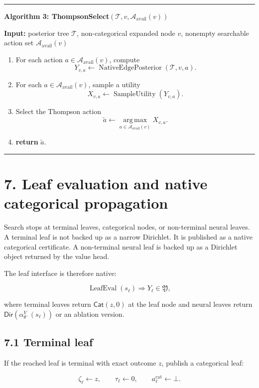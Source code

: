 \documentclass[11pt]{article}
\newcommand{\argmax}{\operatorname*{arg\,max}}
\newcommand{\Tree}{\mathcal{T}}
\newcommand{\Available}{\mathcal{A}_{\mathrm{avail}}}
\newcommand{\Native}{\mathfrak{Y}}
\newcommand{\DirObj}{\mathsf{Dir}}
\newcommand{\CatObj}{\mathsf{Cat}}
\newcommand{\SampleUtility}{\operatorname{SampleUtility}}
\newcommand{\NativeEdgePosterior}{\operatorname{NativeEdgePosterior}}
\newenvironment{algorithmblock}[1]
{
  \par\medskip
  \noindent\hrule\par\smallskip
  \noindent\textbf{#1}
  \par\smallskip
}
{
  \par\smallskip\noindent\hrule\par\medskip
}
\newcommand{\Input}{\textbf{Input: }}
\newcommand{\Return}{\textbf{return }}
\begin{document}
\begin{algorithmblock}{Algorithm 3: ThompsonSelect\((\Tree,v,\Available(v))\)}

\Input posterior tree \(\Tree\), non-categorical expanded node \(v\), nonempty searchable action set \(\Available(v)\)

\begin{enumerate}[leftmargin=2em]
  \item For each action \(a \in \Available(v)\), compute
  \[
  Y_{v,a}
  \gets
  \NativeEdgePosterior(\Tree,v,a).
  \]

  \item For each \(a\in\Available(v)\), sample a utility
  \[
  X_{v,a}
  \gets
  \SampleUtility(Y_{v,a}).
  \]

  \item Select the Thompson action
  \[
  \tilde a
  \gets
  \argmax_{a \in \Available(v)} X_{v,a}.
  \]

  \item \Return \(\tilde a\).
\end{enumerate}

\end{algorithmblock}

\section*{7. Leaf evaluation and native categorical propagation}

Search stops at terminal leaves, categorical nodes, or non-terminal neural
leaves. A terminal leaf is not backed up as a narrow Dirichlet. It is published
as a native categorical certificate. A non-terminal neural leaf is backed up as a
Dirichlet object returned by the value head.

The leaf interface is therefore native:

\[
\operatorname{LeafEval}(s_\ell)
\Rightarrow
Y_\ell\in\Native,
\]

where terminal leaves return \(\CatObj(z,0)\) at the leaf node and neural leaves
return \(\DirObj(\alpha_{\theta^-}^V(s_\ell))\) or an ablation version.

\subsection*{7.1 Terminal leaf}

If the reached leaf is terminal with exact outcome \(z\), publish a categorical
leaf:

\[
\zeta_\ell\gets z,
\qquad
\tau_\ell\gets 0,
\qquad
a_\ell^{\mathrm{cat}}\gets\bot.
\]
\end{document}
